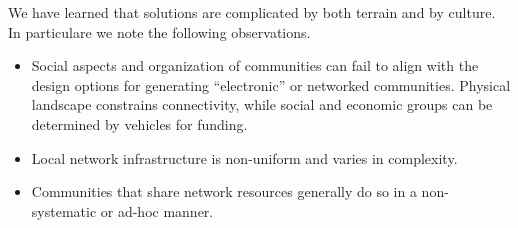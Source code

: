 
We have learned that solutions are complicated by both terrain and by culture.
In particulare we note the following observations.
\begin{itemize}
\item Social aspects and organization of communities can fail to align with the
  design options for generating ``electronic'' or networked communities.
  Physical landscape constrains connectivity, while social and economic groups
  can be determined by vehicles for funding.
\item Local network infrastructure is non-uniform and varies in complexity.
\item Communities that share network resources generally do so in a
  non-systematic or ad-hoc manner.
\end{itemize}


